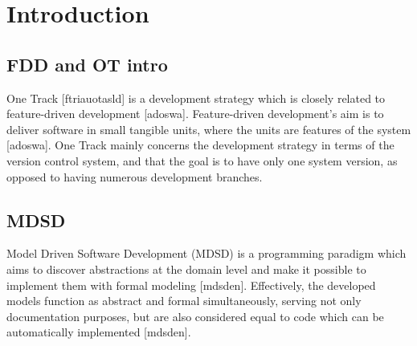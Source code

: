 \documentclass[fina_report_innit.tex]{subfiles}
\begin{document}
\section{Introduction}

\subsection*{FDD and OT intro}
One Track [ftriauotasld] is a development strategy which is closely related to feature-driven development [adoswa]. Feature-driven development's aim is to deliver software in small tangible units, where the units are features of the system [adoswa]. One Track mainly concerns the development strategy in terms of the version control system, and that the goal is to have only one system version, as opposed to having numerous development branches. 

\subsection*{MDSD}
Model Driven Software Development (MDSD) is a programming paradigm which aims to discover abstractions at the domain level and make it possible to implement them with formal modeling [mdsden]. Effectively, the developed models function as abstract and formal simultaneously, serving not only documentation purposes, but are also considered equal to code which can be automatically implemented [mdsden].
\end{document}
